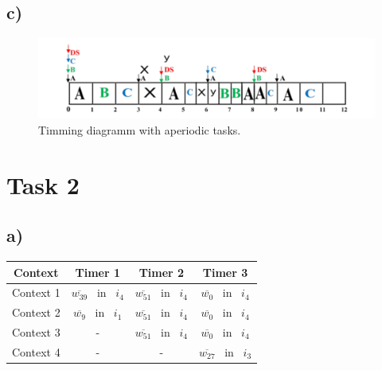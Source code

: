 \documentclass[10pt,a4paper]{article}
\begin{document}
\subsection*{c)}

\begin{figure}[h]
\includegraphics[width=\linewidth]{1c.pdf}
\caption{Timming diagramm with aperiodic tasks.} 
\label{fig:1c}
\end{figure}
\newpage

\section*{Task 2}
\subsection*{a)}
\begin{tabular}{|c|c|c|c|}
\hline
    Context & Timer 1 & Timer 2 & Timer 3 \\
    \hline
    Context 1 & $\overline{w_{39}}$ ~in ~$i_4$ & $\overline{w_{51}}$ ~in ~$i_4$ & $\overline{w_0}$ ~in ~$i_4$ \\
    \hline
    Context 2 & $\overline{w_{9}}$ ~in ~$i_1$ &  $\overline{w_{51}}$ ~in ~$i_4$ & $\overline{w_0}$ ~in ~$i_4$ \\
    \hline
    Context 3 & - &  $\overline{w_{51}}$ ~in ~$i_4$ & $\overline{w_0}$ ~in ~$i_4$ \\
    \hline
    Context 4 & - & - &  $\overline{w_{27}}$ ~in ~$i_3$\\
    \hline
\end{tabular}
\end{document}
